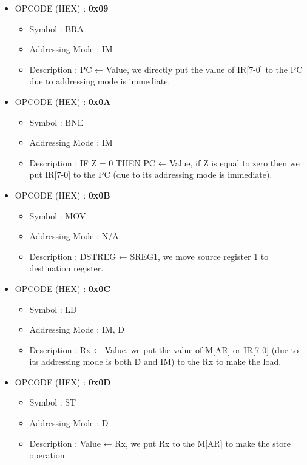 \documentclass[pdftex,12pt,a4paper]{article}
\begin{document}
\begin{itemize}
    \item OPCODE (HEX) : \textbf{0x09}
        \begin{itemize}
            \item Symbol : BRA
            \item Addressing Mode : IM 
            \item Description : PC ← Value, we directly put the value of IR[7-0] to the PC due to addressing mode is immediate.
        \end{itemize}
    \item OPCODE (HEX) : \textbf{0x0A}
        \begin{itemize}
            \item Symbol : BNE
            \item Addressing Mode : IM
            \item Description : IF Z = 0 THEN PC ← Value, if Z is equal to zero then we put IR[7-0] to the PC (due to its addressing mode is immediate).
        \end{itemize}   
    \item OPCODE (HEX) :  \textbf{0x0B} 
        \begin{itemize}
            \item Symbol : MOV
            \item Addressing Mode : N/A
            \item Description : DSTREG ← SREG1, we move source register 1 to destination register.
        \end{itemize}    
    \item OPCODE (HEX) : \textbf{0x0C}
        \begin{itemize}
            \item Symbol : LD
            \item Addressing Mode : IM, D
            \item Description : Rx ← Value, we put the value of M[AR] or IR[7-0] (due to its addressing mode is both D and IM) to the Rx to make the load.
        \end{itemize}
    \item OPCODE (HEX) : \textbf{0x0D}
        \begin{itemize}
            \item Symbol : ST
            \item Addressing Mode : D
            \item Description : Value ← Rx, we put Rx to the M[AR] to make the store operation.
        \end{itemize}    

\end{itemize}
\end{document}
